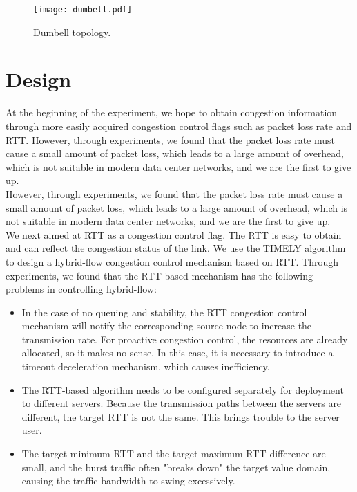 \documentclass[conference]{IEEEtran}
\begin{document}
\begin{figure}[!t]
\centering
\texttt{[image: dumbell.pdf]}
\caption{Dumbell topology.}
\label{fig_sim}
\end{figure}

\section{Design}
At the beginning of the experiment, we hope to obtain congestion information through more easily acquired congestion control flags such as packet loss rate and RTT. However, through experiments, we found that the packet loss rate must cause a small amount of packet loss, which leads to a large amount of overhead, which is not suitable in modern data center networks, and we are the first to give up.\\
\indent However, through experiments, we found that the packet loss rate must cause a small amount of packet loss, which leads to a large amount of overhead, which is not suitable in modern data center networks, and we are the first to give up.\\
\indent We next aimed at RTT as a congestion control flag. The RTT is easy to obtain and can reflect the congestion status of the link. We use the TIMELY algorithm to design a hybrid-flow congestion control mechanism based on RTT. Through experiments, we found that the RTT-based mechanism has the following problems in controlling hybrid-flow:
\begin{itemize}
\item  In the case of no queuing and stability, the RTT congestion control mechanism will notify the corresponding source node to increase the transmission rate. For proactive congestion control, the resources are already allocated, so it makes no sense. In this case, it is necessary to introduce a timeout deceleration mechanism, which causes inefficiency.
\item The RTT-based algorithm needs to be configured separately for deployment to different servers. Because the transmission paths between the servers are different, the target RTT is not the same. This brings trouble to the server user.
\item The target minimum RTT and the target maximum RTT difference are small, and the burst traffic often "breaks down" the target value domain, causing the traffic bandwidth to swing excessively.
\end{itemize}
\end{document}
